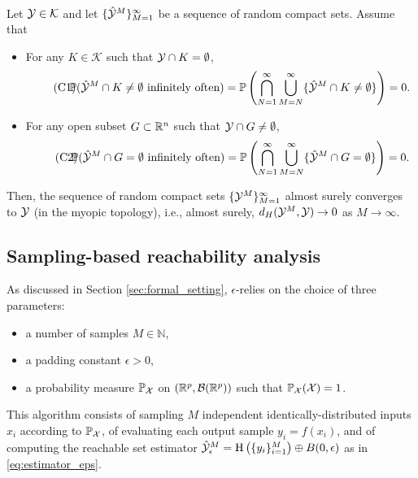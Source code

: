 \documentclass[12pt]{l4dc2022} %
\begin{document}
 \begin{thm}\label{thm:conv_randSets_detLim}
 \\
Let $\mathcal{Y}\in\mathcal{K}$ and let $\{\hat{\mathcal{Y}}^M\}_{M=1}^\infty$ be a sequence of random compact sets. Assume that 
\begin{itemize}[leftmargin=5.5mm]
\item 
For any $K\in\mathcal{K}$ such that $\mathcal{Y}\cap K=\emptyset$,
\begin{equation}\tag{{C1}}\label{eq:C1}
\hspace{-2mm}
\Prob(\hat\Y^M\cap K \neq \emptyset \ \textrm{infinitely often}) 
= 
\Prob\left(\bigcap_{N=1}^\infty\bigcup_{M=N}^\infty
\{\hat\Y^M\cap K \neq \emptyset\}\right) 
=
0.
\end{equation}
\item
For any open subset $G\subset\mathbb{R}^n$ such that $\mathcal{Y}\cap G \neq \emptyset$,
\begin{equation}\tag{{C2}}\label{eq:C2}
\hspace{-2mm}
\Prob(\hat\Y^M\cap G = \emptyset \ \textrm{infinitely often}) 
= 
\Prob\left(\bigcap_{N=1}^\infty\bigcup_{M=N}^\infty
\{\hat\Y^M\cap G = \emptyset\}\right) 
= 
0.
\end{equation}
\end{itemize}
Then, the sequence of random compact sets $\{\mathcal{Y}^M\}_{M=1}^\infty$ 
almost surely converges to $\mathcal{Y}$ (in the myopic topology), i.e., almost surely,
$
d_H(\mathcal{Y}^M,\mathcal{Y})\rightarrow 0
$ 
 as $M\rightarrow\infty$.
\end{thm}


\subsection{Sampling-based reachability analysis}

As discussed in Section  \ref{sec:formal_setting}, 
$\epsilon$-\randup relies on the choice of three parameters: 
\begin{itemize}\setlength\itemsep{0.5mm}
\item a number of samples $M\in\mathbb{N}$, 
\item a padding constant $\epsilon>0$, 
\item a probability measure $\mathbb{P}_{\mathcal{X}}$ on $(\mathbb{R}^{p},\mathcal{B}(\mathbb{R}^{p}))$ such that $\mathbb{P}_{\mathcal{X}}(\mathcal{X})=1$. 
\end{itemize}
% 
This algorithm consists of sampling $M$ independent identically-distributed inputs $x_i$ according to $\mathbb{P}_{\mathcal{X}}$, 
of evaluating each output sample $y_i=f(x_i)$, %
and 
of computing the reachable set estimator $\hat{\mathcal{Y}}_\epsilon^M=\textrm{H}\left(\{y_i\}_{i{=}1}^M\right)\oplus B(0,\epsilon)$ as in \eqref{eq:estimator_eps}. 
\end{document}
